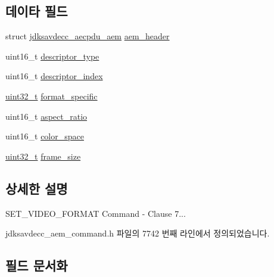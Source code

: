 \subsection*{데이타 필드}
\begin{DoxyCompactItemize}
\item 
struct \hyperlink{structjdksavdecc__aecpdu__aem}{jdksavdecc\+\_\+aecpdu\+\_\+aem} \hyperlink{structjdksavdecc__aem__command__set__video__format_ae1e77ccb75ff5021ad923221eab38294}{aem\+\_\+header}
\item 
uint16\+\_\+t \hyperlink{structjdksavdecc__aem__command__set__video__format_ab7c32b6c7131c13d4ea3b7ee2f09b78d}{descriptor\+\_\+type}
\item 
uint16\+\_\+t \hyperlink{structjdksavdecc__aem__command__set__video__format_a042bbc76d835b82d27c1932431ee38d4}{descriptor\+\_\+index}
\item 
\hyperlink{parse_8c_a6eb1e68cc391dd753bc8ce896dbb8315}{uint32\+\_\+t} \hyperlink{structjdksavdecc__aem__command__set__video__format_acbfc36b550978f88cf0a3d9d2b2ce0dd}{format\+\_\+specific}
\item 
uint16\+\_\+t \hyperlink{structjdksavdecc__aem__command__set__video__format_aa2976b5991e88ce43c451d2683d5f329}{aspect\+\_\+ratio}
\item 
uint16\+\_\+t \hyperlink{structjdksavdecc__aem__command__set__video__format_a5f1234a863bb834ff7c110509884d228}{color\+\_\+space}
\item 
\hyperlink{parse_8c_a6eb1e68cc391dd753bc8ce896dbb8315}{uint32\+\_\+t} \hyperlink{structjdksavdecc__aem__command__set__video__format_a0229abcfe4414f86dcf52c5ebf84311c}{frame\+\_\+size}
\end{DoxyCompactItemize}


\subsection{상세한 설명}
S\+E\+T\+\_\+\+V\+I\+D\+E\+O\+\_\+\+F\+O\+R\+M\+AT Command -\/ Clause 7... 

jdksavdecc\+\_\+aem\+\_\+command.\+h 파일의 7742 번째 라인에서 정의되었습니다.



\subsection{필드 문서화}
